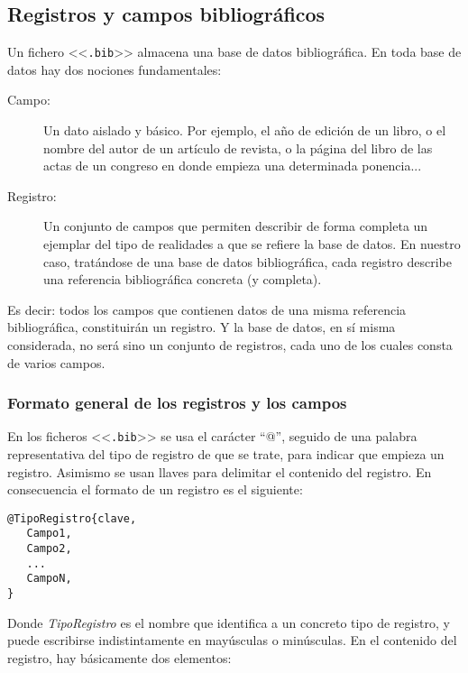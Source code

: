 \documentclass[a4paper,11pt]{article}
\def\ltr#1-{<<\texttt{#1}>>}
\def\tpf#1-{\ltr.#1-}
\begin{document}
\subsection{Registros y campos bibliográficos}
\label{sec:registros-y-campos}

Un fichero \tpf bib- almacena una base de datos bibliográfica. En toda base de
datos hay dos nociones fundamentales:

\begin{description}

\item[Campo:] Un dato  aislado y básico. Por ejemplo, el año  de edición de un
  libro, o  el nombre del  autor de  un artículo de  revista, o la  página del
  libro  de  las  actas  de  un  congreso en  donde  empieza  una  determinada
  ponencia...

\item[Registro:]  Un  conjunto  de  campos  que permiten  describir  de  forma
  completa un  ejemplar del  tipo de realidades  a que  se refiere la  base de
  datos. En nuestro caso, tratándose  de una base de datos bibliográfica, cada
  registro describe una referencia bibliográfica concreta (y completa).

\end{description}

Es  decir:  todos los  campos  que contienen  datos  de  una misma  referencia
bibliográfica,  constituirán un registro.   Y la  base de  datos, en  sí misma
considerada, no  será sino un  conjunto de registros,  cada uno de  los cuales
consta de varios campos.

\subsubsection{Formato general de los registros y los campos}
\label{sec:formato-general-de}

En los  ficheros \tpf bib-  se usa el  carácter ``@'', seguido de  una palabra
representativa del tipo de registro de  que se trate, para indicar que empieza
un registro. Asimismo se usan llaves para delimitar el contenido del registro.
En consecuencia el formato de un registro es el siguiente:


{\small
\begin{verbatim}
@TipoRegistro{clave,
   Campo1,
   Campo2,
   ...
   CampoN,
}
\end{verbatim}
}

Donde \emph{TipoRegistro}  es el nombre que  identifica a un  concreto tipo de
registro, y  puede escribirse indistintamente en mayúsculas  o minúsculas.  En
el contenido del registro, hay básicamente dos elementos:
\end{document}

